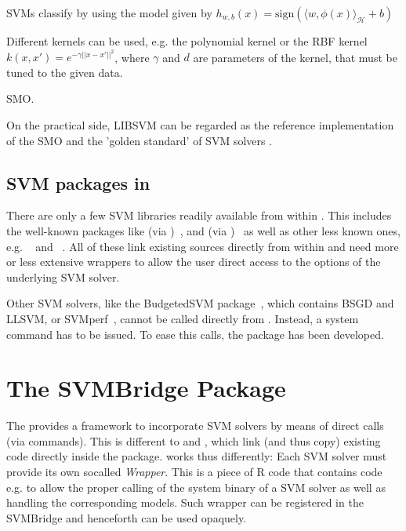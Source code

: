 \documentclass[article, shortnames]{jss}
\begin{document}
SVMs classify by using the model given by
$h_{w,b}(x) = \textrm{sign}(\langle w, \phi(x)\rangle_{\mathcal{H}} + b)$

Different kernels can be used, e.g. the polynomial kernel or the 
RBF kernel $k(x,x') = e^{-\gamma || x-x' ||^2}$, where
$\gamma$ and $d$ are parameters of the kernel, that must
be tuned to the given data.

SMO.

On the practical side, LIBSVM can be regarded as the 
reference implementation of the SMO and the 'golden standard'
of SVM solvers \citep{cc01a}.


\subsection[SVM packages in R]{SVM packages in }

There are only a few SVM libraries readily available from within .
This includes the well-known packages like  (via )~\citep{kernlab}, 
and  (via )~\citep{dimitriadou2008misc}
as well as other less known ones, e.g. ~\citep{SwarmSVM} 
and ~\citep{lasvmR}.
All of these link existing  sources directly from within  and need
more or less extensive wrappers to allow the user direct access to
the options of the underlying SVM solver.

Other SVM solvers, like the BudgetedSVM package~\citep{djuric2014budgetedsvm}, 
which contains BSGD and LLSVM, or SVMperf~\citep{joachims2009sparse}, cannot be called directly from  .
Instead, a system command has to be issued.
To ease this calls, the  package has been developed.



\section{The SVMBridge Package}

The  provides a framework to incorporate 
SVM solvers by means of direct calls (via  commands).
This is different to  and , which link (and
thus copy) existing  code directly inside the package.
 works thus differently: Each SVM solver must provide
its own socalled {\it Wrapper}. This is a piece of R code that contains
code e.g. to allow the proper calling of the system binary of a SVM solver
as well as handling the corresponding models. Such wrapper can be
registered in the SVMBridge and henceforth can be used opaquely.
\end{document}
